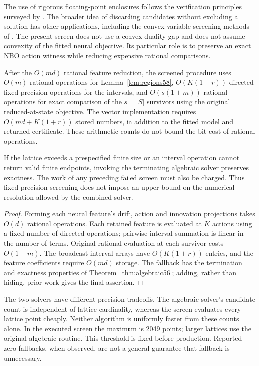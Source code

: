 The use of rigorous floating-point enclosures follows the verification principles surveyed by \citet{rump2010}. The broader idea of discarding candidates without excluding a solution has other applications, including the convex variable-screening methods of \citet{ndiaye2017}. The present screen does not use a convex duality gap and does not assume convexity of the fitted neural objective. Its particular role is to preserve an exact NBO action witness while reducing expensive rational comparisons.

\begin{proposition}\label{prop:screen-work58}
After the $O(md)$ rational feature reduction, the screened procedure uses $O(m)$ rational operations for Lemma~\ref{lem:regions58}, $O(K(1+r))$ directed fixed-precision operations for the intervals, and $O(s(1+m))$ rational operations for exact comparison of the $s=|S|$ survivors using the original reduced-at-state objective. The vector implementation requires $O(md+K(1+r))$ stored numbers, in addition to the fitted model and returned certificate. These arithmetic counts do not bound the bit cost of rational operations.

If the lattice exceeds a prespecified finite size or an interval operation cannot return valid finite endpoints, invoking the terminating algebraic solver preserves exactness. The work of any preceding failed screen must also be charged. Thus fixed-precision screening does not impose an upper bound on the numerical resolution allowed by the combined solver.
\end{proposition}
\begin{proof}
Forming each neural feature's drift, action and innovation projections takes $O(d)$ rational operations. Each retained feature is evaluated at $K$ actions using a fixed number of directed operations; pairwise interval summation is linear in the number of terms. Original rational evaluation at each survivor costs $O(1+m)$. The broadcast interval arrays have $O(K(1+r))$ entries, and the feature coefficients require $O(md)$ storage. The fallback has the termination and exactness properties of Theorem~\ref{thm:algebraic56}; adding, rather than hiding, prior work gives the final assertion.
\end{proof}

The two solvers have different precision tradeoffs. The algebraic solver's candidate count is independent of lattice cardinality, whereas the screen evaluates every lattice point cheaply. Neither algorithm is uniformly faster from these counts alone. In the executed screen the maximum is 2049 points; larger lattices use the original algebraic routine. This threshold is fixed before production. Reported zero fallbacks, when observed, are not a general guarantee that fallback is unnecessary.

